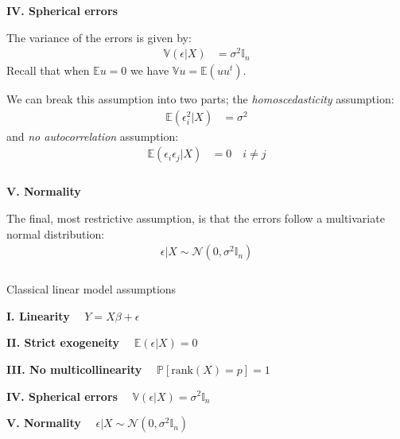 \begin{frame}[fragile] \frametitle{}

{\bf IV. Spherical errors}

The variance of the errors is given by:
\begin{align*}
\mathbb{V} \left( \epsilon | X \right) &= \sigma^2 \mathbb{I}_n
\end{align*}
Recall that when $\mathbb{E}u = 0$ we have $\mathbb{V} u = \mathbb{E} (u u^t)$.

\pause We can break this assumption into two parts; the
{\it homoscedasticity} assumption:
\begin{align*}
\mathbb{E} ( \epsilon_i^2 | X ) &= \sigma^2
\end{align*}
and {\it no autocorrelation} assumption:
\begin{align*}
\mathbb{E} ( \epsilon_i \epsilon_j | X ) &= 0 \quad i \neq j
\end{align*}

\end{frame}

\begin{frame}[fragile] \frametitle{}

{\bf V. Normality}

The final, most restrictive assumption, is that the errors
follow a multivariate normal distribution:
\begin{align*}
\epsilon | X \sim \mathcal{N} (0, \sigma^2 \mathbb{I}_n)
\end{align*}

\end{frame}

\begin{frame}[fragile] \frametitle{}

\begin{center}
{\Large Classical linear model assumptions}
\end{center}

{\bf I. Linearity} $\quad Y = X\beta + \epsilon$

{\bf II. Strict exogeneity} $\quad \mathbb{E} \left( \epsilon | X \right) = 0$

{\bf III. No multicollinearity} $\quad \mathbb{P} \left[ \text{rank} (X) = p \right] = 1$

{\bf IV. Spherical errors} $\quad \mathbb{V} \left( \epsilon | X \right) = \sigma^2 \mathbb{I}_n$

{\bf V. Normality} $\quad \epsilon | X \sim \mathcal{N} (0, \sigma^2 \mathbb{I}_n)$

\end{frame}


